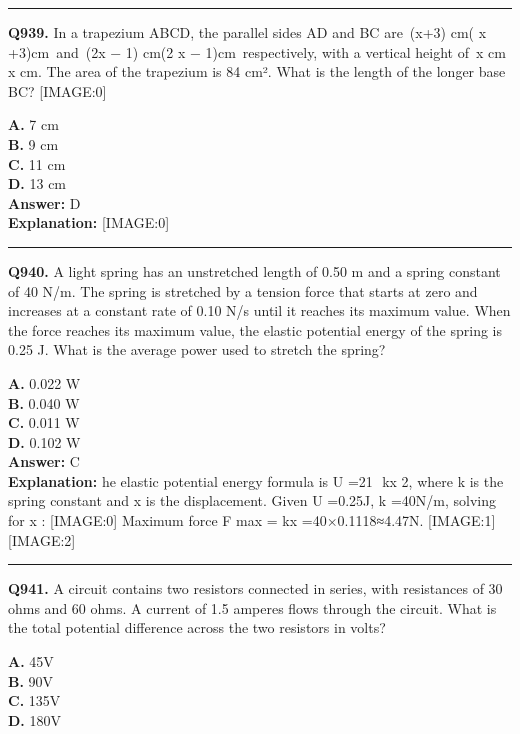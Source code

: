 \documentclass[12pt]{article}
\begin{document}
\hrule
\vspace{1em}


\noindent
\textbf{Q939.} In a trapezium ABCD, the parallel sides AD and BC are (x+3)
cm(
x
+3)cm and (2x
−
1)
cm(2
x
−
1)cm respectively, with a vertical height of x
cm
x
cm. The area of the trapezium is 84 cm². What is the length of the longer base BC?
[IMAGE:0]



\textbf{A.} 7 cm \\
\textbf{B.} 9 cm \\
\textbf{C.} 11 cm \\
\textbf{D.} 13 cm \\

\textbf{Answer:} D \\
\textbf{Explanation:} [IMAGE:0]

\hrule
\vspace{1em}


\noindent
\textbf{Q940.} A light spring has an unstretched length of 0.50 m and a spring constant of 40 N/m. The spring is stretched by a tension force that starts at zero and increases at a constant rate of 0.10 N/s until it reaches its maximum value. When the force reaches its maximum value, the elastic potential energy of the spring is 0.25 J. What is the average power used to stretch the spring?



\textbf{A.} 0.022 W \\
\textbf{B.} 0.040 W \\
\textbf{C.} 0.011 W \\
\textbf{D.} 0.102 W \\

\textbf{Answer:} C \\
\textbf{Explanation:} he elastic potential energy formula is
U
=21
​
kx
2, where
k
is the spring constant and
x
is the displacement.
Given
U
=0.25J,
k
=40N/m, solving for
x
:
[IMAGE:0]
Maximum force
F
max
​
=
kx
=40×0.1118≈4.47N.
[IMAGE:1]
[IMAGE:2]

\hrule
\vspace{1em}


\noindent
\textbf{Q941.} A circuit contains two resistors connected in series, with resistances of 30 ohms and 60 ohms. A current of 1.5 amperes flows through the circuit. What is the total potential difference across the two resistors in volts?



\textbf{A.} 45V \\
\textbf{B.} 90V \\
\textbf{C.} 135V \\
\textbf{D.} 180V \\
\end{document}
